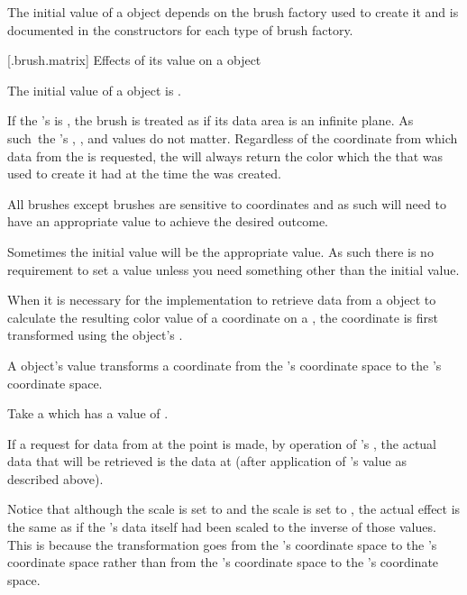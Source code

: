 \pnum
The initial  value of a  object depends on the brush factory used to create it and is documented in the  constructors for each type of brush factory.

 [\iotwod.brush.matrix] {Effects of its  value on a  object}

\pnum
The initial  value of a  object is .

\pnum
If the 's  is , the brush is treated as if its data area is an infinite plane. As such\ the 's , , and  values do not matter. Regardless of the coordinate from which data from the  is requested, the  will always return the color which the  that was used to create it had at the time the  was created.

\pnum
All brushes except  brushes are sensitive to coordinates and as such will need to have an appropriate  value to achieve the desired outcome.

\pnum
\enternote
Sometimes the initial  value will be the appropriate value. As such there is no requirement to set a  value unless you need something other than the initial value.
\exitnote

\pnum
When it is necessary for the implementation to retrieve data from a  object to calculate the resulting color value of a coordinate on a , the coordinate is first transformed using the  object's .

\pnum
A  object's  value transforms a coordinate from the 's coordinate space to the 's coordinate space.

\pnum
\enterexample
Take a  which has a  value of .

\pnum
If a request for data from  at the point  is made, by operation of 's , the actual data that will be retrieved is the data at  (after application of 's  value as described above).

\pnum
Notice that although the \xaxis scale is set to  and the \yaxis scale is set to , the actual effect is the same as if the 's data itself had been scaled to the inverse of those values. This is because the transformation goes from the 's coordinate space to the 's coordinate space rather than from the 's coordinate space to the 's coordinate space.
\exitexample

